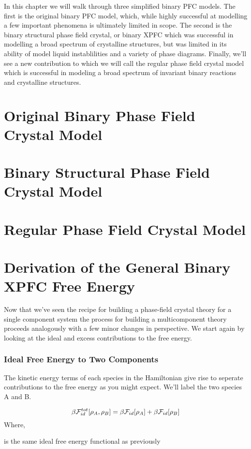 In this chapter we will walk through three simplified binary PFC models. The
first is the original binary PFC model, which, while highly successful at
modelling a few important phenomena is ultimately limited in scope. The second
is the binary structural phase field crystal, or binary XPFC which was
successful in modelling a broad spectrum of crystalline structures, but was
limited in its ability of model liquid instablilities and a variety of phase
diagrams. Finally, we'll see a new contribution to which we will call the
regular phase field crystal model which is successful in modeling a broad
spectrum of invariant binary reactions and crystalline structures. 

\section{Original Binary Phase Field Crystal Model}



\section{Binary Structural Phase Field Crystal Model}

\section{Regular Phase Field Crystal Model}

\section*{Derivation of the General Binary XPFC Free Energy}

Now that we've seen the recipe for building a phase-field crystal theory for a
single component system the process for building a multicomponent theory
proceeds analogously with a few minor changes in perspective.  We start again
by looking at the ideal and excess contributions to the free energy.

\subsubsection{Ideal Free Energy to Two Components} The kinetic energy terms of
each species in the Hamiltonian give rise to seperate contributions to the free
energy as you might expect.  We'll label the two species A and B.

\begin{equation} \beta\mathcal{F}^{tot}_{id}[\rho_A, \rho_B] = \beta\mathcal{F}_{id}[\rho_A] +
\beta\mathcal{F}_{id}[\rho_B] \end{equation} Where,
\begin{description}[labelindent=10pt, labelsep=10pt] \item[$\beta\F_{id}$] is
            the same ideal free energy functional as previously
\end{description}

